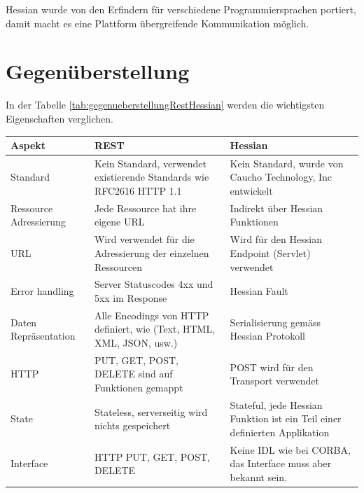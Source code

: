 \documentclass[abstracton, listof=totocnumbered,
bibliography=totocnumbered]{scrreprt}
\begin{document}
  Hessian wurde von den Erfindern für verschiedene Programmiersprachen portiert,
  damit macht es eine Plattform übergreifende Kommunikation möglich.
  
  \newpage
  
  \section{Gegenüberstellung}
  
  In der Tabelle \ref{tab:gegenueberstellungRestHessian} werden die wichtigsten
  Eigenschaften verglichen.
  \newline
  
  \begin{table}[h]
    \begin{center}
      \begin{tabular}{p{2.4cm}p{6.1cm}p{6.1cm}}
        \toprule
        Aspekt & REST & Hessian \\
        \midrule
        \nohyphens{Standard} & Kein Standard, verwendet existierende Standards wie
        RFC2616 HTTP 1.1 & Kein Standard, wurde von Caucho Technology, Inc entwickelt\\
        \cmidrule{2-3}
        \nohyphens{Ressource Adressierung} & Jede Ressource hat ihre eigene \ac{URL}
        & Indirekt über Hessian Funktionen\\
        \cmidrule{2-3}
        \nohyphens{URL} & Wird verwendet für die Adressierung der einzelnen
        Ressourcen & Wird für den Hessian Endpoint (Servlet) verwendet\\
        \cmidrule{2-3}
        \nohyphens{Error handling} & Server Statuscodes 4xx und 5xx im Response &
        Hessian Fault\\
        \cmidrule{2-3}
        \nohyphens{Daten Repräsentation} & Alle Encodings von \ac{HTTP} definiert,
        wie (Text, \ac{HTML}, \ac{XML}, \ac{JSON}, usw.) & Serialisierung
        gemäss Hessian Protokoll\\
        \cmidrule{2-3}
        \nohyphens{HTTP} & PUT, GET, POST, DELETE sind auf Funktionen gemappt & POST
        wird für den Transport verwendet\\
        \cmidrule{2-3}
        \nohyphens{State} & Stateless, serverseitig wird nichts gespeichert &
        Stateful, jede Hessian Funktion ist ein Teil einer definierten Applikation\\
        \cmidrule{2-3}
        \nohyphens{Interface} & \ac{HTTP} PUT, GET, POST, DELETE & Keine \ac{IDL}
        wie bei \ac{CORBA}, das Interface muss aber bekannt sein.\\

\end{tabular}
\end{center}
\end{table}
\end{document}
